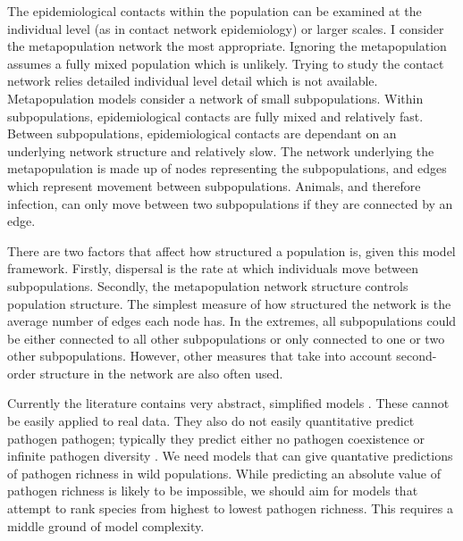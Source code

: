 The epidemiological contacts within the population can be examined at the individual level (as in contact network epidemiology) or larger scales.
I consider the metapopulation network the most appropriate.
Ignoring the metapopulation assumes a fully mixed population which is unlikely.
Trying to study the contact network relies detailed individual level detail which is not available.
Metapopulation models consider a network of small subpopulations. 
Within subpopulations, epidemiological contacts are fully mixed and relatively fast.
Between subpopulations, epidemiological contacts are dependant on an underlying network structure and relatively slow.
The network underlying the metapopulation is made up of nodes representing the subpopulations, and edges which represent movement between subpopulations.
Animals, and therefore infection, can only move between two subpopulations if they are connected by an edge.

There are two factors that affect how structured a population is, given this model framework.
Firstly, dispersal is the rate at which individuals move between subpopulations.
Secondly, the metapopulation network structure controls population structure.
The simplest measure of how structured the network is the average number of edges each node has.
In the extremes, all subpopulations could be either connected to all other subpopulations or only connected to one or two other subpopulations.
However, other measures that take into account second-order structure in the network are also often used.






Currently the literature contains very abstract, simplified models \cite{qiu2013vector, allen2004sis, nunes2006localized, garmer2016multistrain}.
These cannot be easily applied to real data.
They also do not easily quantitative predict pathogen pathogen; typically they predict either no pathogen coexistence \cite{bremermann1989competitive, martcheva2013competitive} or infinite pathogen diversity \cite{may1994superinfection}.
We need models that can give quantative predictions of pathogen richness in wild populations.
While predicting an absolute value of pathogen richness is likely to be impossible, we should aim for models that attempt to rank species from highest to lowest pathogen richness.
This requires a middle ground of model complexity.


